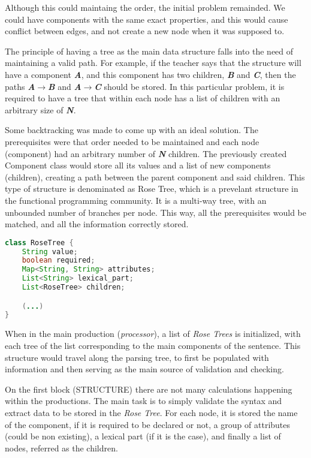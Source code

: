 Although this could maintaing the order, the initial problem remainded. We could have components with the same exact properties, and this would cause conflict between
edges, and not create a new node when it was supposed to.

The principle of having a tree as the main data structure falls into the need of maintaining a valid path. For example, if the teacher says that the structure will have a component \emph{\textbf{A}}, and this component has two children, \emph{\textbf{B}} and \emph{\textbf{C}}, then the paths \emph{\textbf{A$\rightarrow$B}} and \emph{\textbf{A$\rightarrow$C}} should be stored. In this particular problem, it is required to have a tree that within each node has a list of children with an arbitrary size of \emph{\textbf{N}}.

Some backtracking was made to come up with an ideal solution. The prerequisites were that order needed to be maintained and each node (component) had an arbitrary number
of \emph{\textbf{N}} children. The previously created Component class would store all its values and a list of new components (children), creating a path between 
the parent component and said children. This type of structure is denominated as Rose Tree, which is a prevelant structure in the functional programming community. 
It is a multi-way tree, with an unbounded number of branches per node. This way, all the prerequisites would be matched, and all the information correctly stored. 

\begin{center}
\begin{minipage}{9cm}
\begin{lstlisting}[language=java, basicstyle=\small, label={lst:rosetree_class}, caption=RoseTree class]
class RoseTree {
    String value;
    boolean required;
    Map<String, String> attributes;
    List<String> lexical_part;
    List<RoseTree> children;

    (...)
}
\end{lstlisting}
\end{minipage}
\end{center}

When in the main production (\emph{processor}), a list of \emph{Rose Trees} is initialized, with each tree of the list corresponding to the main components of the sentence. This structure would travel along the parsing tree, to first be populated with information and then serving as the main source of validation and checking.

On the first block (STRUCTURE) there are not many calculations happening within the productions. The main task is to simply validate the syntax and extract data to be stored in the \emph{Rose Tree}. For each node, it is stored the name of the component, if it is required to be declared or not, a group of attributes (could be non existing), a lexical part (if it is the case), and finally a list of nodes, referred as the children.

